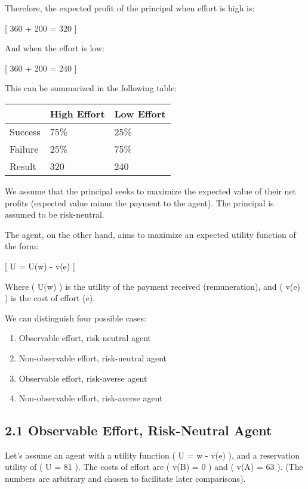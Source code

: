 \documentclass[
  letterpaper,
  DIV=11,
  numbers=noendperiod]{scrartcl}
\providecommand{\tightlist}{%
  \setlength{\itemsep}{0pt}\setlength{\parskip}{0pt}}\usepackage{longtable,booktabs,array}
\begin{document}
Therefore, the expected profit of the principal when effort is high is:

{[} 360  + 200  = 320 {]}

And when the effort is low:

{[} 360  + 200  = 240 {]}

This can be summarized in the following table:

\begin{longtable}[]{@{}lll@{}}
\toprule\noalign{}
& High Effort & Low Effort \\
\midrule\noalign{}
\endhead
\bottomrule\noalign{}
\endlastfoot
Success & 75\% & 25\% \\
Failure & 25\% & 75\% \\
Result & 320 & 240 \\
\end{longtable}

We assume that the principal seeks to maximize the expected value of
their net profits (expected value minus the payment to the agent). The
principal is assumed to be risk-neutral.

The agent, on the other hand, aims to maximize an expected utility
function of the form:

{[} U = U(w) - v(e) {]}

Where ( U(w) ) is the utility of the payment received (remuneration),
and ( v(e) ) is the cost of effort (e).

We can distinguish four possible cases:

\begin{enumerate}
\def\labelenumi{\arabic{enumi}.}
\tightlist
\item
  Observable effort, risk-neutral agent
\item
  Non-observable effort, risk-neutral agent
\item
  Observable effort, risk-averse agent
\item
  Non-observable effort, risk-averse agent
\end{enumerate}

\subsection{2.1 Observable Effort, Risk-Neutral
Agent}\label{observable-effort-risk-neutral-agent}

Let's assume an agent with a utility function ( U = w - v(e) ), and a
reservation utility of ( U = 81 ). The costs of effort are ( v(B) = 0 )
and ( v(A) = 63 ). (The numbers are arbitrary and chosen to facilitate
later comparisons).
\end{document}
